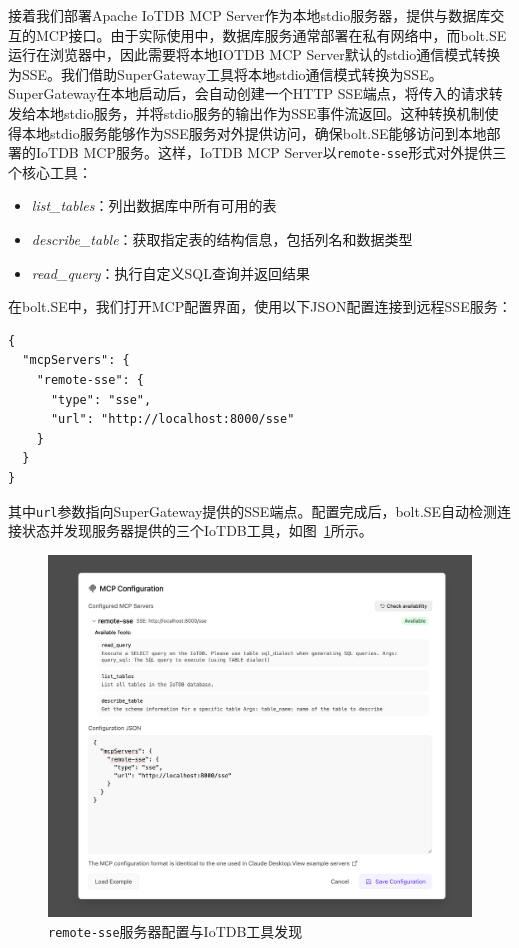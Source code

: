 接着我们部署Apache IoTDB MCP Server\cite{IoTDBMCP2025}作为本地stdio服务器，提供与数据库交互的MCP接口。由于实际使用中，数据库服务通常部署在私有网络中，而bolt.SE运行在浏览器中，因此需要将本地IOTDB MCP Server默认的stdio通信模式转换为SSE。我们借助SuperGateway\cite{SuperGateway2025}工具将本地stdio通信模式转换为SSE。SuperGateway在本地启动后，会自动创建一个HTTP SSE端点，将传入的请求转发给本地stdio服务，并将stdio服务的输出作为SSE事件流返回。这种转换机制使得本地stdio服务能够作为SSE服务对外提供访问，确保bolt.SE能够访问到本地部署的IoTDB MCP服务。这样，IoTDB MCP Server以\texttt{remote-sse}形式对外提供三个核心工具：
\begin{itemize}
  \item \textit{list\_tables}：列出数据库中所有可用的表
  \item \textit{describe\_table}：获取指定表的结构信息，包括列名和数据类型
  \item \textit{read\_query}：执行自定义SQL查询并返回结果
\end{itemize}

在bolt.SE中，我们打开MCP配置界面，使用以下JSON配置连接到远程SSE服务：

\begin{verbatim}
{
  "mcpServers": {
    "remote-sse": {
      "type": "sse",
      "url": "http://localhost:8000/sse"
    }
  }
}
\end{verbatim}

其中\texttt{url}参数指向SuperGateway提供的SSE端点。配置完成后，bolt.SE自动检测连接状态并发现服务器提供的三个IoTDB工具，如图~\ref{fig:mcp-config}所示。

\begin{figure}
  \centering
  \includegraphics[width=\textwidth]{figures/screenshots/iotdb-demo/mcp-config.png}
  \caption{\texttt{remote-sse}服务器配置与IoTDB工具发现}
  \label{fig:mcp-config}
\end{figure}


